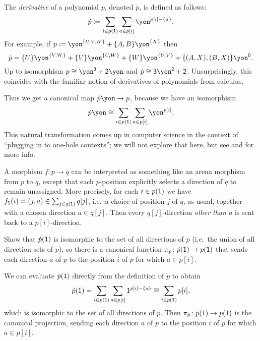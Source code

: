 \documentclass[Book-Poly]{subfiles}
\begin{document}
\begin{example}[Derivatives]\label{ex.derivatives}
The \emph{derivative} of a polynomial $p$, denoted $\dot{p}$, is defined as follows:
\[
\dot{p}\coloneqq\sum_{i\in p(\1)}\sum_{a\in p[i]}\yon^{p[i]-\{a\}}.
\]
For example, if $p\coloneq\yon^{\{U,V,W\}}+\{A,B\}\yon^{\{X\}}$ then 
\[\dot{p}=\{U\}\yon^{\{V,W\}}+\{V\}\yon^{\{U,W\}}+\{W\}\yon^{\{U,V\}}+\{(A,X),(B,X)\}\yon^\0.\]
Up to isomorphism $p\cong\yon^\3+\2\yon$ and $\dot{p}\cong\3\yon^\2+\2$.
Unsurprisingly, this coincides with the familiar notion of derivatives of polynomials from calculus.

Thus we get a canonical map $\dot{p}\yon\to p$, because we have an isomorphism
\[
\dot{p}\yon\cong\sum_{i\in p(\1)}\sum_{a\in p[i]}\yon^{p[i]}.
\]
This natural transformation comes up in computer science in the context of ``plugging in to one-hole contexts''; we will not explore that here, but see \cite{mcbride} and \cite{abbot2003derivatives} for more info.%

A morphism $f\colon p\to \dot{q}$ can be interpreted as something like an arena morphism from $p$ to $q$, except that each $p$-position explicitly selects a direction of $q$ to remain unassigned. More precisely, for each $i\in p(\textsf{1})$ we have $f_{\textsf{1}}(i)=(j,a)\in \sum_{j\in q(\textsf{1})}q[j]$, i.e.\ a choice of position $j$ of $q$, as usual, together with a chosen direction $a\in q[j]$. Then every $q[j]$-direction \emph{other than $a$} is sent back to a $p[i]$-direction.
\end{example}

\begin{exercise} \label{exc.deriv_directions}
Show that $\dot{p}(\textsf{1})$ is isomorphic to the set of all directions of $p$ (i.e.\ the union of all direction-sets of $p$), so there is a canonical function $\pi_p \colon \dot{p}(\textsf{1}) \to p(\textsf{1})$ that sends each direction $a$ of $p$ to the position $i$ of $p$ for which $a \in p[i]$.
\begin{solution}
We can evaluate $\dot{p}(\textsf{1})$ directly from the definition of $\dot{p}$ to obtain
\[
    \dot{p}(\textsf{1}) = \sum_{i \in p(\textsf{1})} \sum_{a \in p[i]} \textsf{1}^{p[i]-\{a\}} \cong \sum_{i \in p(\textsf{1})} p[i],
\]
which is isomorphic to the set of all directions of $p$.
Then $\pi_p \colon \dot{p}(\textsf{1}) \to p(\textsf{1})$ is the canonical projection, sending each direction $a$ of $p$ to the position $i$ of $p$ for which $a \in p[i]$.
\end{solution}
\end{exercise}
\end{document}
